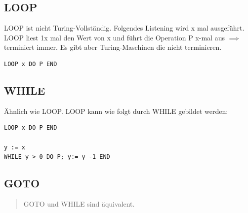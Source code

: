 \documentclass[11pt,twoside,landscape]{article}
\begin{document}
\begin{multicols}{3}
\subsection{LOOP}
\label{sec:org97f48be}
LOOP ist nicht Turing-Vollständig. Folgendes Listening wird x mal ausgeführt. LOOP liest 1x mal den Wert von x und führt die Operation P x-mal aus \(\implies\) terminiert immer. Es gibt aber Turing-Maschinen die nicht terminieren.
\begin{verbatim}
LOOP x DO P END
\end{verbatim}

\subsection{WHILE}
\label{sec:orge197c45}
Ähnlich wie LOOP. LOOP kann wie folgt durch WHILE gebildet werden:
\begin{verbatim}
LOOP x DO P END

y := x
WHILE y > 0 DO P; y:= y -1 END
\end{verbatim}

\subsection{GOTO}
\label{sec:orgdca4338}
\begin{quote}
GOTO und WHILE sind äquivalent.
\end{quote}


\end{multicols}
\newpage
\end{document}
